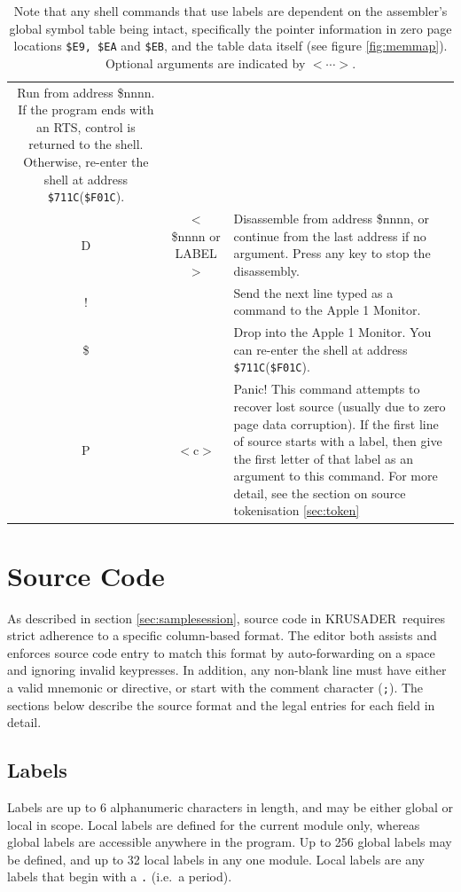 \documentclass[12pt]{article}
\newcommand{\replica}[1]{\textsf{#1}}
\newcommand{\krusader}{\textsf{KRUSADER}}
\begin{document}
\begin{table}[p]
\begin{tabular}{|c|c|p{10cm}|}
									Run from address \replica{\$nnnn}.  If the
									program ends with an RTS, control is returned to the
									shell.  Otherwise, re-enter the shell at address
									\texttt{\$711C}(\texttt{\$F01C}).\tabularnewline
	\replica{D} & $<$\replica{\$nnnn} or \replica{LABEL}$>$ & Disassemble
									from address \replica{\$nnnn}, or continue from the last
									address if no argument.  Press any key to stop the disassembly.\tabularnewline
	\replica{!} & & Send the next line typed as a command to the Apple 1 Monitor.\tabularnewline
	\replica{\$} & & Drop into the Apple 1 Monitor.  You can re-enter the shell at address
									\texttt{\$711C}(\texttt{\$F01C}).\tabularnewline
	\replica{P} & \replica{$<$c$>$} & Panic!  This command attempts to recover lost source
									(usually due to zero page data corruption).  If the first
									line of source starts with a label, then give the first
									letter of that label as an argument to this command.  For
									more detail, see the section on source tokenisation
									\ref{sec:token}\tabularnewline
	\hline
	\end{tabular}
	\caption{\krusader\ shell commands.}\caption*{Note that any shell commands that use labels
	are dependent on the assembler's global symbol table being intact, specifically the pointer information
	in zero page locations \texttt{\$E9, \$EA} and \texttt{\$EB}, and the table data itself (see
	figure \ref{fig:memmap}). 	Optional arguments are indicated by $<\cdots>$.}
	\label{tab:shellcmds}
\end{table}
\section{Source Code}

As described in section \ref{sec:samplesession}, source code in \krusader\ requires strict adherence to a specific column-based format.
The editor both assists and enforces source code entry to match this format by auto-forwarding on a space and ignoring invalid keypresses.  In addition, any non-blank line must have either a valid mnemonic or directive, or start with the comment character (\texttt{;}).  The sections below describe the source format and the legal entries for each field in detail.

\subsection{Labels}
\label{sec:labels}

Labels are up to 6 alphanumeric characters in length, and may be either global or local in scope.  Local labels are defined for the current module only, whereas global labels are accessible anywhere in the program.  Up to 256 global labels may be defined, and up to 32 local labels in any one module.  Local labels are any labels that begin with a \texttt{.} (i.e.~a period).
\end{document}
